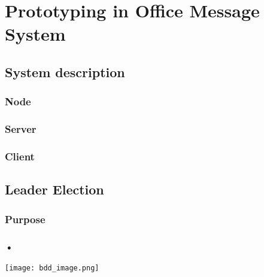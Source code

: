 \chapter{Prototyping in Office Message System}

\section{System description}
\subsection{Node}

\subsection{Server}

\subsection{Client}

\section{Leader Election}
\subsection{Purpose}
\subsection{•}


\begin{center}
	\texttt{[image: bdd\_image.png]}
\end{center}
